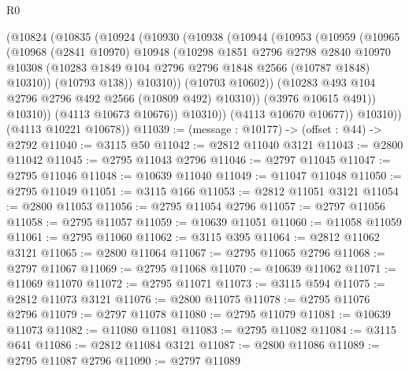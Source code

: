 \begin{lexlean}{R0}
\begin{coremodule}
              (@10824
                (@10835
                  (@10924
                    (@10930
                      (@10938
                        (@10944
                          (@10953
                            (@10959
                              (@10965
                                (@10968
                                  (@2841 @10970)
                                  @10948
                                  (@10298
                                    @1851
                                    @2796
                                    @2798
                                    @2840
                                    @10970
                                    @10308
                                    (@10283
                                      @1849
                                      @104
                                      @2796
                                      @2796
                                      @1848
                                      @2566
                                      (@10787 @1848)
                                      @10310))
                                  (@10793 @138))
                                @10310))
                            (@10703 @10602))
                          (@10283 @493 @104 @2796 @2796 @492 @2566 (@10809 @492) @10310))
                        (@3976 @10615 @491))
                      @10310))
                  (@4113 @10673 @10676))
                @10310))
            (@4113 @10670 @10677))
          @10310))
      (@4113 @10221 @10678))
@11039 := (message : @10177) -> (offset : @44) -> @2792
@11040 := @3115 @50
@11042 := @2812 @11040 @3121
@11043 := @2800 @11042
@11045 := @2795 @11043 @2796
@11046 := @2797 @11045
@11047 := @2795 @11046
@11048 := @10639 @11040
@11049 := @11047 @11048
@11050 := @2795 @11049
@11051 := @3115 @166
@11053 := @2812 @11051 @3121
@11054 := @2800 @11053
@11056 := @2795 @11054 @2796
@11057 := @2797 @11056
@11058 := @2795 @11057
@11059 := @10639 @11051
@11060 := @11058 @11059
@11061 := @2795 @11060
@11062 := @3115 @395
@11064 := @2812 @11062 @3121
@11065 := @2800 @11064
@11067 := @2795 @11065 @2796
@11068 := @2797 @11067
@11069 := @2795 @11068
@11070 := @10639 @11062
@11071 := @11069 @11070
@11072 := @2795 @11071
@11073 := @3115 @594
@11075 := @2812 @11073 @3121
@11076 := @2800 @11075
@11078 := @2795 @11076 @2796
@11079 := @2797 @11078
@11080 := @2795 @11079
@11081 := @10639 @11073
@11082 := @11080 @11081
@11083 := @2795 @11082
@11084 := @3115 @641
@11086 := @2812 @11084 @3121
@11087 := @2800 @11086
@11089 := @2795 @11087 @2796
@11090 := @2797 @11089

\end{coremodule}
\end{lexlean}
